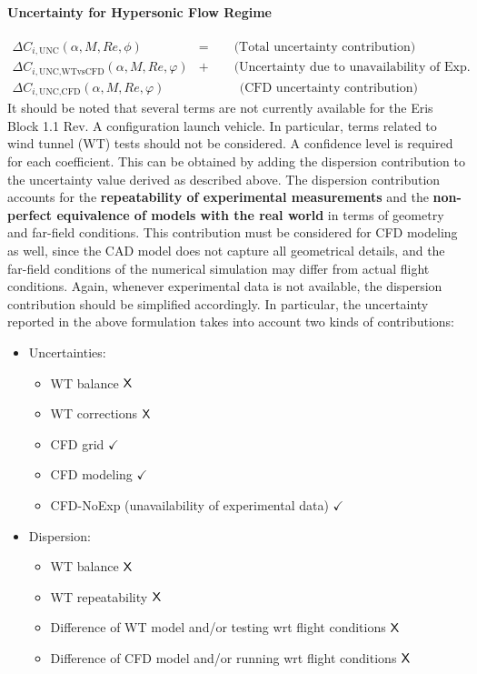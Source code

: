 \documentclass[12pt]{article}
\begin{document}
\paragraph{\textbf{Uncertainty for Hypersonic Flow Regime}}
\begin{align}
\Delta C_{i,\text{UNC}}(\alpha, M, Re, \phi) &= \qquad \text{(Total uncertainty contribution)}\label{eq:hyp1} \\
\Delta C_{i,\text{UNC,WTvsCFD}}(\alpha, M, Re, \varphi) &+ \qquad \text{(Uncertainty due to unavailability of Exp. data)}\label{eq:hyp2} \\
\Delta C_{i,\text{UNC,CFD}}(\alpha, M, Re, \varphi) & \quad \ \qquad \text{(CFD uncertainty contribution)}\label{eq:hyp3}
\end{align}
%
It should be noted that several terms are not currently available for the Eris Block 1.1 Rev. A configuration launch vehicle. In particular, terms related to wind tunnel (WT) tests should not be considered. A confidence level is required for each coefficient. This can be obtained by adding the dispersion contribution to the uncertainty value derived as described above. The dispersion contribution accounts for the \textbf{repeatability of experimental measurements} and the \textbf{non-perfect equivalence of models with the real world} in terms of geometry and far-field conditions. This contribution must be considered for CFD modeling as well, since the CAD model does not capture all geometrical details, and the far-field conditions of the numerical simulation may differ from actual flight conditions. Again, whenever experimental data is not available, the dispersion contribution should be simplified accordingly. In particular, the uncertainty reported in the above formulation takes into account two kinds of contributions:
%
\begin{itemize}
    \item Uncertainties:
    \begin{itemize}
        \item WT balance $\text{\sffamily X}$
        \item WT corrections $\text{\sffamily X}$
        \item CFD grid $\checkmark$
        \item CFD modeling $\checkmark$
        \item CFD-NoExp (unavailability of experimental data) $\checkmark$
    \end{itemize}
    \item Dispersion:
    \begin{itemize}
        \item WT balance $\text{\sffamily X}$
        \item WT repeatability $\text{\sffamily X}$
        \item Difference of WT model and/or testing wrt flight conditions $\text{\sffamily X}$
        \item Difference of CFD model and/or running wrt flight conditions $\text{\sffamily X}$
    \end{itemize}
\end{itemize}
\end{document}

